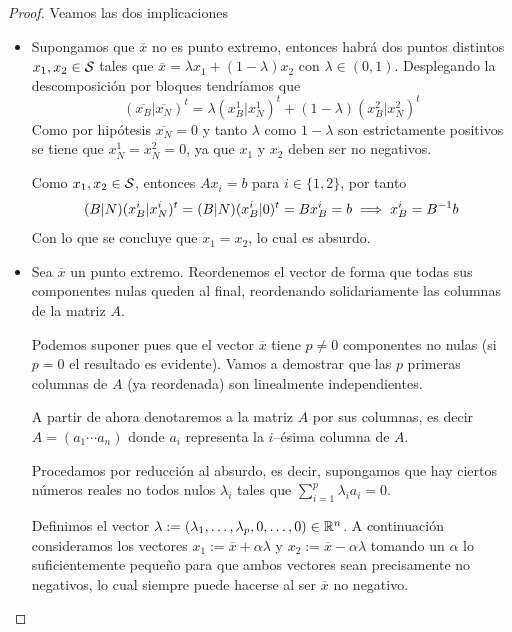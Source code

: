 \begin{proof}
	Veamos las dos implicaciones
	\begin{itemize}
		\item[\bla] Supongamos que $\overline{x}$ no es punto extremo, entonces habrá dos puntos distintos $x_1,x_2\in\mathcal{S}$ tales que $\overline{x}=\lambda x_1+(1-\lambda)x_2$ con $\lambda\in(0,1)$. Desplegando la descomposición por bloques tendríamos que
		\begin{equation*}
			(\overline{x_B}|\overline{x_N})^t=\lambda(x_B^1|x_N^1)^t+(1-\lambda)(x_B^2|x_N^2)^t
		\end{equation*}
		Como por hipótesis $\overline{x_N}=0$ y tanto $\lambda$ como $1-\lambda$ son estrictamente positivos se tiene que $x_N^1=x_N^2=0$, ya que $x_1$ y $x_2$ deben ser no negativos.
		
		Como $x_1,x_2\in\mathcal{S}$, entonces $Ax_i=b$ para $i\in\{1,2\}$, por tanto
		\begin{equation*}
			(B|N)(x_B^i|x_N^i)^t=(B|N)(x_B^i|0)^t=Bx_B^i=b\implies x_B^i=B^{-1}b
		\end{equation*}
		Con lo que se concluye que $x_1=x_2$, lo cual es absurdo.
		\item[\bra] Sea $\overline{x}$ un punto extremo. Reordenemos el vector de forma que todas sus componentes nulas queden al final, reordenando solidariamente las columnas de la matriz $A$.
		
		Podemos suponer pues que el vector $\overline{x}$ tiene $p\not=0$ componentes no nulas (si $p=0$ el resultado es evidente). Vamos a demostrar que las $p$ primeras columnas de $A$ (ya reordenada) son linealmente independientes. 
		
		A partir de ahora denotaremos a la matriz $A$ por sus columnas, es decir $A=(a_1\cdots a_n)$ donde $a_i$ representa la $i$--ésima columna de $A$.
		
		Procedamos por reducción al absurdo, es decir, supongamos que hay ciertos números reales no todos nulos $\lambda_i$ tales que $\sum_{i=1}^{p}\lambda_ia_i=0$.
		
		Definimos el vector $\lambda:=(\lambda_1,\dots,\lambda_p,0,\dots,0)\in\mathbb{R}^n$. A continuación consideramos los vectores  $x_1:=\overline{x}+\alpha\lambda$ y $x_2:=\overline{x}-\alpha\lambda$ tomando un $\alpha$ lo suficientemente pequeño para que ambos vectores sean precisamente no negativos, lo cual siempre puede hacerse al ser $\overline{x}$ no negativo.
		

\end{itemize}
\end{proof}
